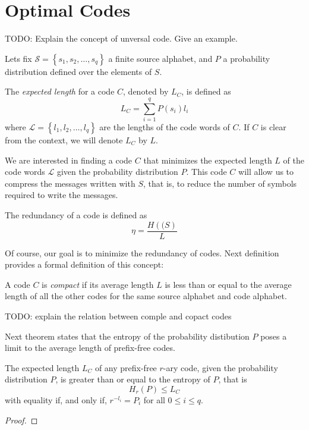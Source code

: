 \begin{example}
\end{example}

%
%

\section{Optimal Codes}
\label{sec:Optimal-Codes}

{\color{red} TODO: Explain the concept of unversal code. Give an example.}

Lets fix $\mathcal{S}=\left\{ s_{1},s_{2},\ldots,s_{q}\right\}$ a finite source alphabet, and $P$ a probability distribution defined over the elements of $S$.

\begin{definition}
The \emph{expected length} for a code $C$, denoted by $L_{C}$, is defined as
\[
L_{C} = \sum_{i=1}^{q} P(s_{i})l_{i}
\]
where $\mathcal{L} = \left\{ l_{1},l_{2},\ldots,l_{q}\right\}$ are the lengths of the code words of $C$. If $C$ is clear from the context, we will denote $L_{C}$ by $L$.
\end{definition}

We are interested in finding a code $C$ that minimizes the expected length $L$ of the code words $\mathcal{L}$ given the probability distribution $P$. This code $C$ will allow us to compress the messages written with $S$, that is, to reduce the number of symbols required to write the messages.

\begin{definition}
The redundancy of a code is defined as
\[
\eta = \frac{H(\mathcal(S)}{L}
\]
\end{definition}

Of course, our goal is to minimize the redundancy of codes. Next definition provides a formal definition of this concept:

\begin{definition}
A code $C$ is \emph{compact} if its average length $L$ is less than or equal to the average length of all the other codes for the same source alphabet and code alphabet.
\end{definition}

{\color{red} TODO: explain the relation between comple and copact codes}

Next theorem states that the entropy of the probability distibution $P$ poses a limit to the average length of prefix-free codes.

\begin{theorem}
\label{th:optimal_codes}
The expected length $L_{C}$ of any prefix-free $r$-ary code, given the probability distribution $P$, is greater than or equal to the entropy of $P$, that is
\[
H_{r}(P) \leq L_{C}
\]
with equality if, and only if, $r^{-l_{i}} = P_{i}$ for all $0 \leq i \leq q$.
\end{theorem}
\begin{proof}
\end{proof}

